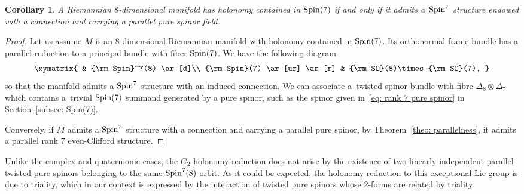 \documentclass[10pt,a4paper]{amsart}
\numberwithin{equation}{section}
\newtheorem{Corollary}[Theorem]{Corollary}
\begin{document}
\begin{Corollary} A Riemannian $8$-dimensional manifold has holonomy contained in ${\rm Spin}(7)$ if and only if it admits a~${\rm Spin}^7$ structure endowed with a connection and carrying a parallel pure spinor field.
\end{Corollary}
\begin{proof} Let us assume $M$ is an $8$-dimensional Riemannian manifold with holonomy contained in ${\rm Spin}(7)$. Its orthonormal frame bundle has a parallel reduction to a principal bundle with fiber ${\rm Spin}(7)$. We have the following diagram
\begin{gather*}
\xymatrix{
 & {\rm Spin}^7(8) \ar[d]\\
{\rm Spin}(7) \ar[ur] \ar[r] & {\rm SO}(8)\times {\rm SO}(7),
}
\end{gather*}
so that the manifold admits a ${\rm Spin}^7$ structure with an induced connection. We can associate a~twisted spinor bundle with fibre $\Delta_{8}\otimes \Delta_7$ which contains a~trivial ${\rm Spin}(7)$ summand generated by a pure spinor, such as the spinor given in~\eqref{eq: rank 7 pure spinor} in Section~\ref{subsec: Spin(7)}.

Conversely, if $M$ admits a ${\rm Spin}^7$ structure with a connection and carrying a parallel pure spinor, by Theorem~\ref{theo: parallelness}, it admits a parallel rank $7$ even-Clifford structure.
\end{proof}

Unlike the complex and quaternionic cases, the $G_2$ holonomy reduction does not arise by the existence of two linearly independent parallel twisted pure spinors belonging to the same ${\rm Spin}^7(8)$-orbit. As it could be expected, the holonomy reduction to this exceptional Lie group is due to triality, which in our context is
expressed by the interaction of twisted pure spinors whose 2-forms are related by triality.
\end{document}
